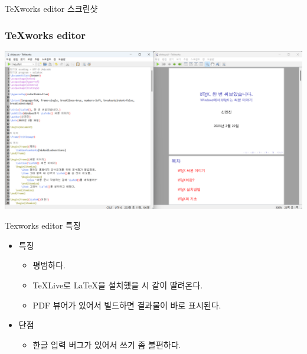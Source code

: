 \documentclass{beamer}
\begin{document}
\begin{frame}[allowframebreaks]{TeXworks editor 스크린샷}
    \subsubsection{TeXworks editor}
    \begin{center}
        \includegraphics[scale=0.25]{images/texworks_editor.png}
    \end{center}
\end{frame}
\begin{frame}{Texworks editor 특징}
    \begin{itemize}
        \item 특징
        \begin{itemize}
            \item 평범하다.
            \item TeXLive로 \LaTeX{}을 설치했을 시 같이 딸려온다.
            \item PDF 뷰어가 있어서 빌드하면 결과물이 바로 표시된다.
        \end{itemize}
        \item 단점
        \begin{itemize}
            \item 한글 입력 버그가 있어서 쓰기 좀 불편하다.
        \end{itemize}
    \end{itemize}
\end{frame}
\end{document}
